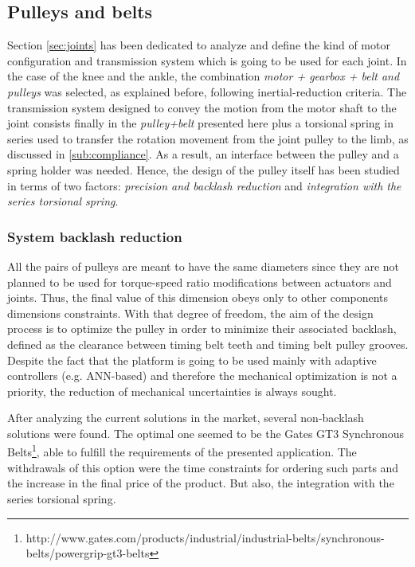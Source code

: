 \subsection{Pulleys and belts} %

\label{sub:pulleys_and_belts}
Section \ref{sec:joints} has been dedicated to analyze and define the kind of motor configuration and transmission system which is going to be used for each joint.
In the case of the knee and the ankle, the combination \textit{motor + gearbox + belt and pulleys} was selected, as explained before, following inertial-reduction criteria.
The transmission system designed to convey the motion from the motor shaft to the joint consists finally in the \textit{pulley+belt} presented here plus a torsional spring in series used to transfer the rotation movement from the joint pulley to the limb, as discussed in \ref{sub:compliance}.
As a result, an interface between the pulley and a spring holder was needed.
Hence, the design of the pulley itself has been studied in terms of two factors: \textit{precision and backlash reduction} and \textit{integration with the series torsional spring}.

\subsubsection{System backlash reduction} %
\label{ssub:precision_and_backlash_reduction}
All the pairs of pulleys are meant to have the same diameters since they are not planned to be used for torque-speed ratio modifications between actuators and joints. 
Thus, the final value of this dimension obeys only to other components dimensions constraints.
With that degree of freedom, the aim of the design process is to optimize the pulley in order to minimize their associated backlash, defined as the clearance between timing belt teeth and timing belt pulley grooves.
Despite the fact that the platform is going to be used mainly with adaptive controllers (e.g. ANN-based) and therefore the mechanical optimization is not a priority, the reduction of mechanical uncertainties is always sought.

After analyzing the current solutions in the market, several non-backlash solutions were found.
The optimal one seemed to be the Gates GT3 Synchronous Belts\footnote{http://www.gates.com/products/industrial/industrial-belts/synchronous-belts/powergrip-gt3-belts}, able to fulfill the requirements of the presented application.
The withdrawals of this option were the time constraints for ordering such parts and the increase in the final price of the product. 
But also, the integration with the series torsional spring.


